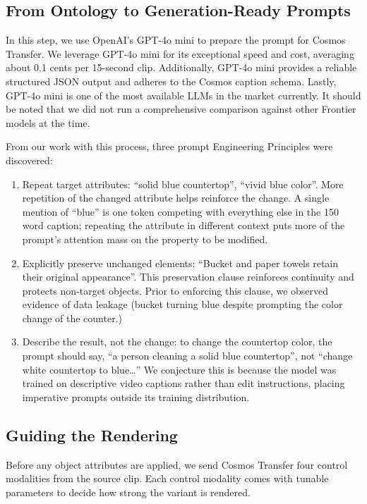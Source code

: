 \documentclass[runningheads]{llncs}
\begin{document}
\subsection{From Ontology to Generation-Ready Prompts}

In this step, we use OpenAI's GPT-4o mini \cite{r17} to prepare the prompt for Cosmos Transfer. We leverage GPT-4o mini for its exceptional speed and cost, averaging about 0.1 cents per 15-second clip. Additionally, GPT-4o mini provides a reliable structured JSON output and adheres to the Cosmos caption schema. Lastly, GPT-4o mini is one of the most available LLMs in the market currently. It should be noted that we did not run a comprehensive comparison against other Frontier models at the time.

From our work with this process, three prompt Engineering Principles were discovered:

\begin{enumerate}
\item Repeat target attributes: ``solid blue countertop'', ``vivid blue color''. More repetition of the changed attribute helps reinforce the change. A single mention of ``blue'' is one token competing with everything else in the 150 word caption; repeating the attribute in different context puts more of the prompt's attention mass on the property to be modified.
\item Explicitly preserve unchanged elements: ``Bucket and paper towels retain their original appearance''. This preservation clause reinforces continuity and protects non-target objects. Prior to enforcing this clause, we observed evidence of data leakage (bucket turning blue despite prompting the color change of the counter.)
\item Describe the result, not the change: to change the countertop color, the prompt should say, ``a person cleaning a solid blue countertop'', not ``change white countertop to blue\ldots'' We conjecture this is because the model was trained on descriptive video captions rather than edit instructions, placing imperative prompts outside its training distribution.
\end{enumerate}

\subsection{Guiding the Rendering}

Before any object attributes are applied, we send Cosmos Transfer four control modalities from the source clip. Each control modality comes with tunable parameters to decide how strong the variant is rendered.
\end{document}
